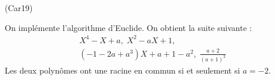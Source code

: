 \begin{tiny}(Car19)\end{tiny} On implémente l'algorithme d'Euclide. On obtient la suite suivante :
\begin{multline*}
 X^4 -X+a,\; X^2-aX+1,\;\\
(-1-2a+a^3)X+a+1-a^2,\; \frac{a+2}{(a+1)^2}
\end{multline*}
Les deux polynômes ont une racine en commun si et seulement si $a=-2$.
